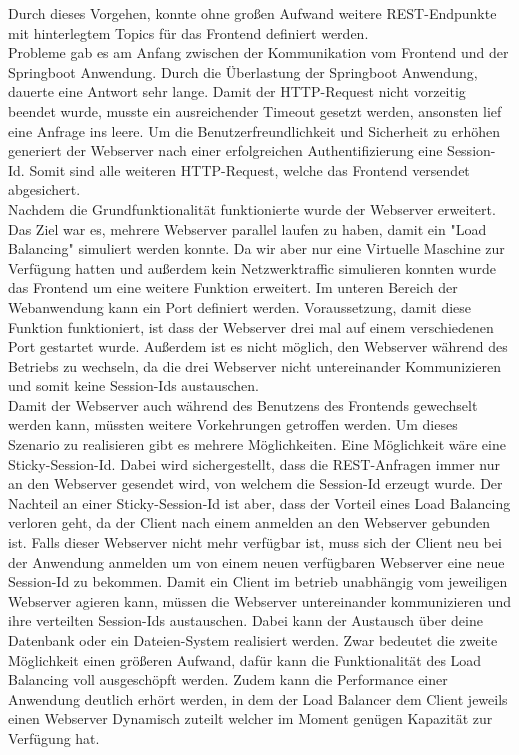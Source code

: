 Durch dieses Vorgehen, konnte ohne großen Aufwand weitere REST-Endpunkte mit hinterlegtem Topics für das Frontend definiert werden. \\
Probleme gab es am Anfang zwischen der Kommunikation vom Frontend und der Springboot Anwendung. Durch die Überlastung der Springboot Anwendung, dauerte eine Antwort sehr lange. Damit der HTTP-Request nicht vorzeitig beendet wurde, musste ein ausreichender Timeout gesetzt werden, ansonsten lief eine Anfrage ins leere. Um die Benutzerfreundlichkeit und Sicherheit zu erhöhen generiert der Webserver nach einer erfolgreichen Authentifizierung eine Session-Id. Somit sind alle weiteren HTTP-Request, welche das Frontend versendet abgesichert. \\
Nachdem die Grundfunktionalität funktionierte wurde der Webserver erweitert. \\
Das Ziel war es, mehrere Webserver parallel laufen zu haben, damit ein "Load Balancing" simuliert werden konnte. Da wir aber nur eine Virtuelle Maschine zur Verfügung hatten und außerdem kein Netzwerktraffic simulieren konnten wurde das Frontend um eine weitere Funktion erweitert.
Im unteren Bereich der Webanwendung kann ein Port definiert werden. Voraussetzung, damit diese Funktion funktioniert, ist dass der Webserver drei mal auf einem verschiedenen Port gestartet wurde. Außerdem ist es nicht möglich, den Webserver während des Betriebs zu wechseln, da die drei Webserver nicht untereinander Kommunizieren und somit keine Session-Ids austauschen. \\
Damit der Webserver auch während des Benutzens des Frontends gewechselt werden kann, müssten weitere Vorkehrungen getroffen werden. Um dieses Szenario zu realisieren gibt es mehrere Möglichkeiten. 
Eine Möglichkeit wäre eine Sticky-Session-Id. Dabei wird sichergestellt, dass die REST-Anfragen immer nur an den Webserver gesendet wird, von welchem die Session-Id erzeugt wurde. Der Nachteil an einer Sticky-Session-Id ist aber, dass der Vorteil eines Load Balancing verloren geht, da der Client nach einem anmelden an den Webserver gebunden ist. Falls dieser Webserver nicht mehr verfügbar ist, muss sich der Client neu bei der Anwendung anmelden um von einem neuen verfügbaren Webserver eine neue Session-Id zu bekommen.
Damit ein Client im betrieb unabhängig vom jeweiligen Webserver agieren kann, müssen die Webserver untereinander kommunizieren und ihre verteilten Session-Ids austauschen. Dabei kann der Austausch über deine Datenbank oder ein Dateien-System realisiert werden. Zwar bedeutet die zweite Möglichkeit einen größeren Aufwand, dafür kann die Funktionalität des  Load Balancing voll ausgeschöpft werden. Zudem kann die Performance einer Anwendung deutlich erhört werden, in dem der Load Balancer dem Client jeweils einen Webserver Dynamisch zuteilt welcher im Moment genügen Kapazität zur Verfügung hat.

